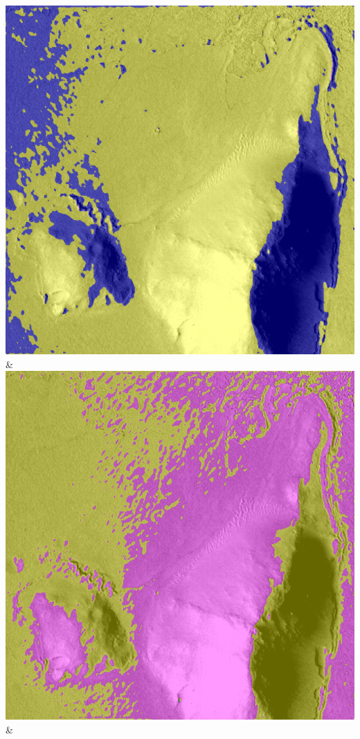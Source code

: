 \begin{table}[h!]
\begin{tabularx}{\textwidth}
		\includegraphics[width=0.9\linewidth]{images/gen/number_of_segments/p03_04.png_20.png} &
		\includegraphics[width=0.9\linewidth]{images/gen/number_of_segments/p03_04.png_50.png} &

\end{tabularx}
\end{table}
